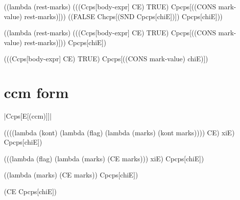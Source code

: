 \begin{schemeblock}
\begin{schemedisplay}
((lambda (rest-marks) 
   (((Ccps[body-expr] CE) TRUE) Cpcps[((CONS mark-value) rest-marks)]))
 ((FALSE Chcps[(SND Cpcps[chiE])]) Cpcps[chiE]))
\end{schemedisplay}
\end{schemeblock}

\begin{schemeblock}
\begin{schemedisplay}
((lambda (rest-marks) 
   (((Ccps[body-expr] CE) TRUE) Cpcps[((CONS mark-value) rest-marks)]))
 Cpcps[chiE])
\end{schemedisplay}
\end{schemeblock}

\begin{schemeblock}
\begin{schemedisplay}
(((Ccps[body-expr] CE) TRUE) Cpcps[((CONS mark-value) chiE)])
\end{schemedisplay}
\end{schemeblock}

\section{ccm form}

\noindent
\scheme|Ccps[E[(ccm)]]|
\begin{schemeblock}
\begin{schemedisplay}
((((lambda (kont)
     (lambda (flag)
       (lambda (marks)
         (kont marks))))
   CE) xiE) Cpcps[chiE])
\end{schemedisplay}
\end{schemeblock}

\begin{schemeblock}
\begin{schemedisplay}
(((lambda (flag)
    (lambda (marks)
      (CE marks)))
  xiE) Cpcps[chiE])
\end{schemedisplay}
\end{schemeblock}

\begin{schemeblock}
\begin{schemedisplay}
((lambda (marks)
   (CE marks))
 Cpcps[chiE])
\end{schemedisplay}
\end{schemeblock}

\begin{schemeblock}
\begin{schemedisplay}
(CE Cpcps[chiE])
\end{schemedisplay}
\end{schemeblock}

